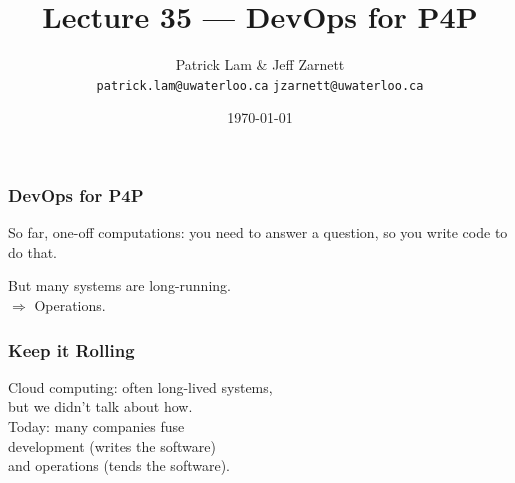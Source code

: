 

\title{Lecture 35 --- DevOps for P4P }

\author{Patrick Lam \& Jeff Zarnett \\ \small \texttt{patrick.lam@uwaterloo.ca} \texttt{jzarnett@uwaterloo.ca}}
\date{\today}




\begin{frame}
  \titlepage

 \end{frame}



\begin{frame}
\frametitle{DevOps for P4P}

\large
\begin{changemargin}{2cm}
So far, one-off computations:
you need to answer a question, so you write code to do that.

But many systems are long-running.\\
$\Rightarrow$ Operations.
\end{changemargin}

\end{frame}



\begin{frame}
\frametitle{Keep it Rolling}

\Large
\begin{changemargin}{1cm}
Cloud computing: often long-lived systems,\\
but we didn't talk about how.\\[1em]
Today: many companies fuse\\
development (writes the software) \\
and operations (tends the software).
\end{changemargin}
\end{frame}



